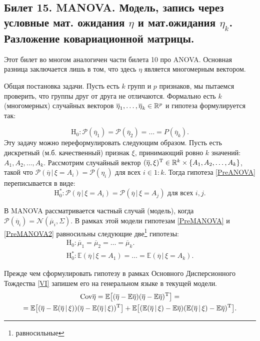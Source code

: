 \subsection{ Билет 15. MANOVA. Модель, запись через условные мат. ожидания $\eta$ и мат.ожидания $\eta_k$. Разложение ковариационной матрицы. }

Этот билет во многом аналогичен части билета 10 про ANOVA.
Основная разница заключается лишь в том, что здесь $\eta$ является многомерным вектором.

Общая постановка задачи.
Пусть есть $k$ групп и $p$ признаков, мы пытаемся проверить, что группы друг от друга не отличаются.
Формально есть $k$ (многомерных) случайных векторов $\overline \eta_1, \ldots, \overline \eta_k \in \mathbb{R}^p$ и гипотеза формулируется так:

\begin{equation}
    \label{PreMANOVA}
    \mathrm H_0: \mathcal P(\overline \eta_1) = \mathcal P(\overline \eta_2) = \ldots \mathcal = P(\overline \eta_k).
\end{equation}
Эту задачу можно переформулировать следующим образом.
Пусть есть дискретный (м.б. качественный) признак $\xi$, принимающий ровно $k$ значений: $A_1, A_2, \ldots, A_k$.
Рассмотрим случайный вектор $(\overline \eta, \xi)^{\mathrm{T}} \in \mathbb{R}^k \times \{A_1, A_2, \ldots, A_k\}$,
такой что $\mathcal P(\overline \eta \, | \, \xi = A_i) = \mathcal P(\eta_i)$ для всех $i \in 1:k$.
Тогда гипотеза \eqref{PreANOVA} переписывается в виде:
\begin{equation}
    \label{PreMANOVA2}
    \mathrm H_0^*: \mathcal P(\overline \eta \, | \, \xi = A_i) = \mathcal P(\overline \eta \, | \, \xi = A_j) \text{ для всех $i, j$}.
\end{equation}

В MANOVA рассматривается частный случай (модель), когда $\mathcal P(\overline \eta_i) = \mathcal N(\overline \mu_i, \Sigma)$.
В рамках этой модели гипотезам \eqref{PreMANOVA} и \eqref{PreMANOVA2} равносильны следующие две\footnote{равносильные} гипотезы:
\begin{gather}
    \label{MANOVA}
    \mathrm H_0: \overline \mu_1 = \overline \mu_2 = \ldots = \overline \mu_k.\\
    \mathrm H_0^*: \mathbb E (\overline \eta \, | \, \xi = A_1) = \ldots = \mathbb E (\overline \eta \, | \, \xi = A_k).
    \nonumber
\end{gather}

Прежде чем сформулировать гипотезу в рамках Основного Дисперсионного Тождества \eqref{VI} запишем его на генеральном языке
в текущей модели.
\begin{gather}
    \label{MANOVA_VI_gen}
    \mathrm {Cov} \overline \eta = 
    \mathbb E \big[(\overline \eta - \mathbb E \overline \eta) (\overline \eta - \mathbb E \overline \eta)^{\mathrm{T}}\big] = \\ =
    \mathbb E \big[(\overline \eta - \mathbb E (\overline \eta \, | \, \xi)) 
              (\overline \eta - \mathbb E (\overline \eta \, | \, \xi))^{\mathrm{T}}\big] +
    \mathbb E \big[(\mathbb E (\overline \eta \, | \, \xi) - \mathbb E \overline \eta)
              (\mathbb E (\overline \eta \, | \, \xi) - \mathbb E \overline \eta)^{\mathrm{T}}\big].
\end{gather}

